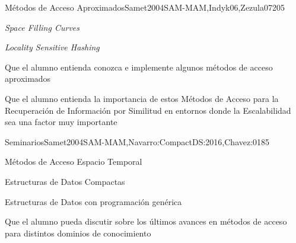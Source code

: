 \begin{syllabus}
\begin{unit}{Métodos de Acceso Aproximados}{Samet2004SAM-MAM,Indyk06,Zezula07}{20}{5}
   \begin{topics}
         \item {\it Space Filling Curves}
         \item {\it Locality Sensitive Hashing}
   \end{topics}

   \begin{unitgoals}
         \item Que el alumno entienda conozca e implemente algunos métodos de acceso aproximados
         \item Que el alumno entienda la importancia de estos Métodos de Acceso para la Recuperación de Información por Similitud en entornos donde la Escalabilidad sea una factor muy importante
   \end{unitgoals}
\end{unit}

\begin{unit}{Seminarios}{Samet2004SAM-MAM,Navarro:CompactDS:2016,Chavez:01}{8}{5}
	\begin{topics}
         \item Métodos de Acceso Espacio Temporal
         \item Estructuras de Datos Compactas
         \item Estructuras de Datos con programación genérica
   \end{topics}

   \begin{unitgoals}
         \item Que el alumno pueda discutir sobre los últimos avances en métodos de acceso para distintos dominios de conocimiento
   \end{unitgoals}
\end{unit}



\begin{coursebibliography}
\end{coursebibliography}

\end{syllabus}
